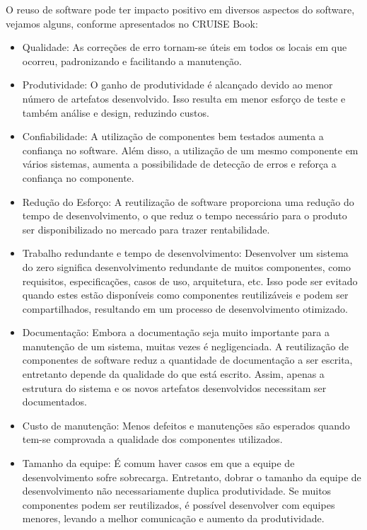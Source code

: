 O reuso de software pode ter impacto positivo em diversos aspectos do software, vejamos alguns, conforme apresentados no CRUISE Book:

\begin{itemize}

\item Qualidade: As correções de erro tornam-se úteis em todos os locais em que ocorreu, padronizando e facilitando a manutenção.

\item Produtividade: O ganho de produtividade é alcançado devido ao menor número de artefatos desenvolvido. Isso resulta em menor esforço de teste e também análise e design, reduzindo custos.

\item Confiabilidade: A utilização de componentes bem testados aumenta a
confiança no software. Além disso, a utilização de um mesmo componente em vários sistemas, aumenta a possibilidade de detecção de erros e reforça a confiança no componente.

\item Redução do Esforço: A reutilização de software proporciona uma redução do tempo de desenvolvimento, o que reduz o tempo necessário para o produto ser disponibilizado no mercado para trazer rentabilidade.

\item Trabalho redundante e tempo de desenvolvimento: Desenvolver um sistema do
zero significa desenvolvimento redundante de muitos componentes, como requisitos, especificações, casos de uso, arquitetura, etc. Isso pode ser evitado quando estes estão disponíveis como componentes reutilizáveis e podem ser compartilhados, resultando em um processo de desenvolvimento otimizado.

\item Documentação: Embora a documentação seja muito importante para a
manutenção de um sistema, muitas vezes é negligenciada. A reutilização de componentes de software reduz a quantidade de documentação a ser escrita, entretanto depende da qualidade do que está escrito. Assim, apenas a estrutura do sistema e os novos artefatos desenvolvidos necessitam ser documentados.

\item Custo de manutenção: Menos defeitos e manutenções são esperados quando tem-se comprovada a qualidade dos componentes utilizados.

\item Tamanho da equipe: É comum haver casos em que a equipe de desenvolvimento sofre sobrecarga. Entretanto, dobrar o tamanho da equipe de desenvolvimento não necessariamente duplica produtividade. Se muitos componentes podem ser reutilizados, é possível desenvolver com equipes menores, levando a melhor comunicação e aumento da produtividade.

\end{itemize}

